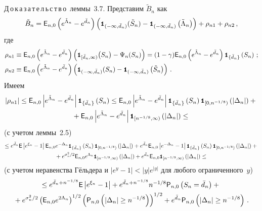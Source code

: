 \noindent
Д\,о\,к\,а\,з\,а\,т\,е\,л\,ь\,с\,т\,в\,о~леммы~3.7.
Представим $\tilde B_n$ как
\begin{equation*}
\tilde B_n={{\sf E}}_{n,0}\left(e^{\tilde \Lambda_n}-e^{\bar d_n}\right)
\left({\mbox{{\small \tt {1}}\hspace{-1.5mm}{\tt 1}}}_{(-\infty,\bar d_n)}(\tilde S_n)-{\mbox{{\small \tt {1}}\hspace{-1.5mm}{\tt 1}}}_{(-\infty,\bar d_n)}\left(\tilde\Lambda_n\right)\right)
+
\rho_{n1}+\rho_{n2}\,,
\end{equation*}
где
\begin{align*}
\rho_{n1}&\equiv{{\sf E}}_{n,0}\left(e^{\tilde \Lambda_n}-e^{\bar d_n}\right)
\left({\mbox{{\small \tt {1}}\hspace{-1.5mm}{\tt 1}}}_{[\bar d_n,\infty)}\bigl(S_n\bigr)-\Psi_n(S_n)\right)
=
(1-\gamma){{\sf E}}_{n,0}\left(e^{\tilde \Lambda_n}-e^{\bar d_n}\right){\mbox{{\small \tt {1}}\hspace{-1.5mm}{\tt 1}}}_{\{\bar d_n\}}\left(S_n\right)\,;
\\
\rho_{n2}&\equiv{{\sf E}}_{n,0}\left(e^{\tilde \Lambda_n}-e^{\bar d_n}\right)
\left({\mbox{{\small \tt {1}}\hspace{-1.5mm}{\tt 1}}}_{(-\infty,\bar d_n)}(S_n)-{\mbox{{\small \tt {1}}\hspace{-1.5mm}{\tt 1}}}_{(-\infty,\bar d_n)}\left(\tilde S_n\right)\right)\,.
\end{align*}
Имеем
\begin{multline*}
|\rho_{n1}|\leq{{\sf E}}_{n,0}\left|e^{\tilde \Lambda_n}-e^{\bar d_n}\right|{\mbox{{\small \tt {1}}\hspace{-1.5mm}{\tt 1}}}_{\{\bar d_n\}}\left(S_n\right)
\leq{{\sf E}}_{n,0}\left|e^{\tilde \Lambda_n}-e^{\bar d_n}\right|{\mbox{{\small \tt {1}}\hspace{-1.5mm}{\tt 1}}}_{\{\bar d_n\}}
\left(S_n\right){\mbox{{\small \tt {1}}\hspace{-1.5mm}{\tt 1}}}_{[0,n^{-1/8})}\left(|\Delta_n|\right)
+{}\\
{}+{{\sf E}}_{n,0}\left|e^{\tilde \Lambda_n}-e^{\bar d_n}\right|{\mbox{{\small \tt {1}}\hspace{-1.5mm}{\tt 1}}}_{[n^{-1/8},\infty)}
\left(|\Delta_n|\right)\leq{}
\end{multline*}
(с учетом леммы~2.5)
\begin{multline*}
\leq e^{\bar d_n}{\e}\left|e^{\xi_n}-1\right| {\e}_{n,0}e^{-\Delta_n}{\Ik}_{\{\bar d_n\}}
\left(S_n\right){\Ik}_{[0,n^{-1/8})}\left(|\Delta_n|\right)+
e^{\bar d_n}{\e}_{n,0}\left|e^{-\Delta_n}-1\right|{\Ik}_{\{\bar d_n\}}\left(S_n\right)
{\Ik}_{[0,n^{-1/8})}\left(|\Delta_n|\right)+{}\\
{}
+e^{\sigma_n^2/2}{\e}_{n,0}e^{\Lambda_n}{\Ik}_{[n^{-1/8},\infty)}\left(|\Delta_n|\right)+
e^{\bar d_n}{\e}_{n,0}{\Ik}_{[n^{-1/8},\infty)}\left(|\Delta_n|\right)\leq{}
\end{multline*}
(с учетом неравенства Гёльдера и $|e^y-1|<|y|e^{|y|}$ для любого ограниченного~$y$)
\begin{multline*}
\leq e^{\bar d_n+n^{-1/8}}{{\sf E}}\left|e^{\xi_n}-1\right|+
e^{\bar d_n+n^{-1/8}}n^{-1/8}{{\sf P}}_{n,0}\left (S_n = \bar d_n\right)+{}\\
{}
+e^{\sigma_n^2/2}\left({{\sf E}}_{n,0}e^{2\Lambda_n}\right)^{1/2}\left({{\sf P}}_{n,0}\left(|\Delta_n|\geq n^{-1/8}\right)
\right)^{1/2}+
e^{\bar d_n}{{\sf P}}_{n,0}\left(|\Delta_n|\geq n^{-1/8}\right)\,.
\end{multline*}
